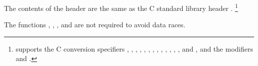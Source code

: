 \pnum
{}%
%
The contents of the header  are the same as the C standard library header .%
\footnote{ supports the C conversion specifiers
, , , , , , ,
, , , , , , and
, and the modifiers  and .}

\pnum
The functions , , , and
 are not required to avoid data
races.

